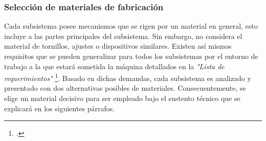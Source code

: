 \subsubsection{Selección de materiales de fabricación}
\label{sssec:seleccion de materiales de fabricacion}

Cada subsistema posee mecanismos que se rigen por un material en general, esto incluye a las partes principales del subsistema. Sin embargo, no considera el material de tornillos, ajustes o dispositivos similares. Existen así mismos requisitos que se pueden generalizar para todos los subsistemas por el entorno de trabajo a la que estará sometida la máquina detallados en la \textit{"Lista de requerimientos"} \footnote{\cite{DiazVergara2020}.}. Basado en dichas demandas, cada subsistema es analizado y presentado con dos alternativas posibles de materiales. Consecuentemente, se elige un material decisivo para ser empleado bajo el sustento técnico que se explicará en los siguientes párrafos.

